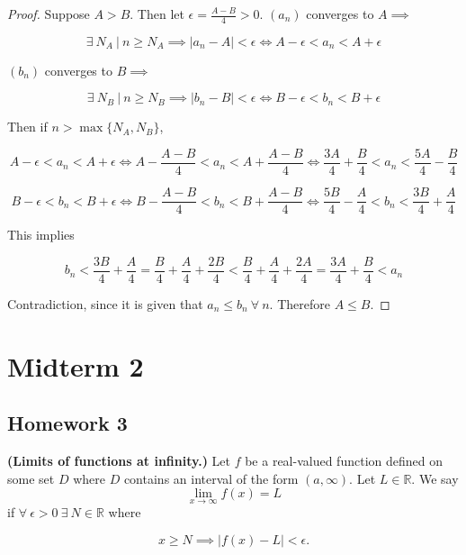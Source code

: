 \begin{proof} Suppose \(A > B\). Then let \(\epsilon = \frac{A - B}{4} > 0\). \((a_n)\) converges to \(A \implies\)

\[
\exists \ N_A \ | \ n \geq N_A \implies | a_n - A | < \epsilon \iff A - \epsilon < a_n < A + \epsilon
\]

\((b_n)\) converges to \(B \implies\)

\[
\exists \ N_B \ | \ n \geq N_B \implies | b_n - B | < \epsilon \iff B - \epsilon < b_n < B + \epsilon
\]

Then if \(n > \max \{ N_A, N_B\} \),

\[
A - \epsilon < a_n < A + \epsilon \iff A - \frac{A - B}{4} < a_n < A +\frac{A - B}{4} \iff \frac{3A}{4} + \frac{B}{4} < a_n <  \frac{5A}{4} - \frac{B}{4}
\]

\[
B - \epsilon < b_n < B + \epsilon \iff B -\frac{A - B}{4}< b_n < B+ \frac{A - B}{4} \iff \frac{5B}{4} - \frac{A}{4} < b_n <  \frac{3B}{4} + \frac{A}{4}
\]

This implies

\[
 b_n <  \frac{3B}{4} + \frac{A}{4} = \frac{B}{4} + \frac{A}{4} + \frac{2B}{4} < \frac{B}{4} + \frac{A}{4} + \frac{2A}{4}  = \frac{3A}{4} + \frac{B}{4} < a_n
\]

Contradiction, since it is given that \(a_n \leq b_n \ \forall \ n\). Therefore \(A \leq B\).
\end{proof}

\pagebreak

\section{Midterm 2}

\subsection{Homework 3}

\begin{definition} \textbf{(Limits of functions at infinity.)} Let \(f\) be a real-valued function defined on some set \(D\) where \(D\) contains an interval of the form \((a, \infty)\). Let \(L \in \mathbb{R}\). We say \[\lim_{x \to \infty} f(x) = L\]if \(\forall \ \epsilon >0 \ \exists \ N \in \mathbb{R}\) where

\[
x \geq N \implies |f(x) - L| < \epsilon.
\]

\end{definition}

